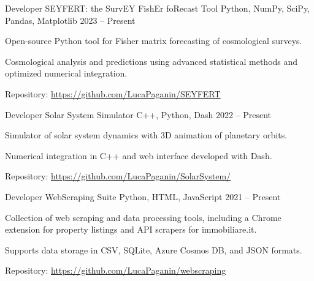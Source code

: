 


\begin{cventries}


\cventry
{Developer} %
{SEYFERT: the SurvEY FishEr foRecast Tool} %
{Python, NumPy, SciPy, Pandas, Matplotlib} %
{2023 -- Present} %
{ %
\begin{cvitems}
  \item {Open-source Python tool for Fisher matrix forecasting of cosmological surveys.}
  \item {Cosmological analysis and predictions using advanced statistical methods and optimized numerical integration.}
  \item {Repository: \url{https://github.com/LucaPaganin/SEYFERT}}  
\end{cvitems}
}


\cventry
{Developer} %
{Solar System Simulator} %
{C++, Python, Dash} %
{2022 -- Present} %
{ %
\begin{cvitems}
  \item {Simulator of solar system dynamics with 3D animation of planetary orbits.}
  \item {Numerical integration in C++ and web interface developed with Dash.}
  \item {Repository: \url{https://github.com/LucaPaganin/SolarSystem/}}  
\end{cvitems}
}


\cventry
{Developer} %
{WebScraping Suite} %
{Python, HTML, JavaScript} %
{2021 -- Present} %
{ %
\begin{cvitems}
  \item {Collection of web scraping and data processing tools, including a Chrome extension for property listings and API scrapers for immobiliare.it.}
  \item {Supports data storage in CSV, SQLite, Azure Cosmos DB, and JSON formats.}
  \item {Repository: \url{https://github.com/LucaPaganin/webscraping}}  
\end{cvitems}
}


\end{cventries}

